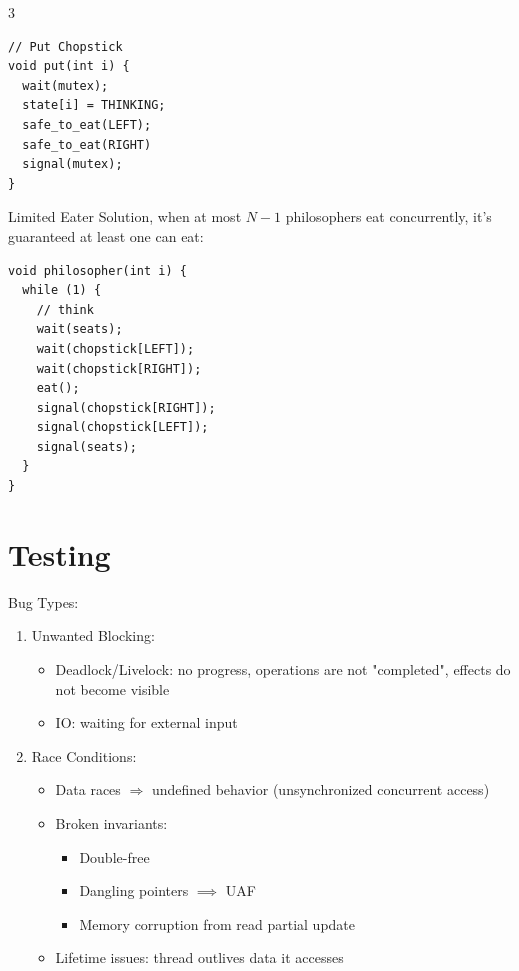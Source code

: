 \documentclass[12pt, a4paper]{article}
\begin{document}
\begin{multicols*}{3}
\begin{minipage}{0.45\columnwidth}
\begin{lstlisting}
// Put Chopstick
void put(int i) {
  wait(mutex);
  state[i] = THINKING;
  safe_to_eat(LEFT);
  safe_to_eat(RIGHT)
  signal(mutex);
}
  \end{lstlisting}
\end{minipage}
Limited Eater Solution, when at most $N-1$ philosophers eat concurrently, it's guaranteed at least one can eat:
\begin{lstlisting}
void philosopher(int i) {
  while (1) {
    // think 
    wait(seats);
    wait(chopstick[LEFT]);
    wait(chopstick[RIGHT]);
    eat();
    signal(chopstick[RIGHT]);
    signal(chopstick[LEFT]);
    signal(seats);
  }
}
\end{lstlisting}
\colbreak
\section{Testing}
\lstset{style=c}
Bug Types:
\begin{enumerate}[\roman*.]
\item Unwanted Blocking:
  \begin{itemize}[leftmargin=*]
    \item Deadlock/Livelock: no progress, operations are not "completed", effects do not become visible
    \item IO: waiting for external input
  \end{itemize}
\item Race Conditions:
  \begin{itemize}[leftmargin=*]\vspace{3pt}
    \item Data races $\Rightarrow$ undefined behavior (unsynchronized concurrent access)
    \item Broken invariants:
      \begin{itemize}[leftmargin=*]\vspace{5pt}
        \item Double-free 
        \item Dangling pointers $\implies$ UAF
        \item Memory corruption from read partial update
      \end{itemize}
    \item Lifetime issues: thread outlives data it accesses
  \end{itemize}
\end{enumerate}


\end{multicols*}
\end{document}
